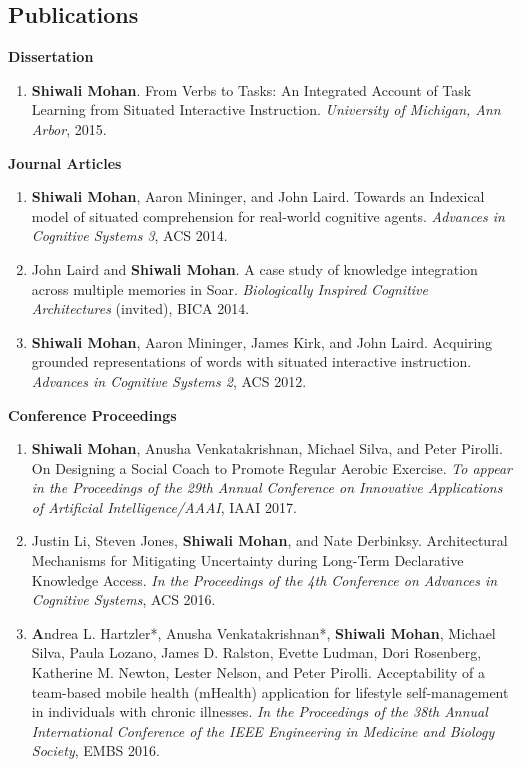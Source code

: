 \documentclass[margin,line,11pt]{res}
\begin{document}
\begin{resume}
                  \section{\sc Publications}
                  \textbf{Dissertation}
                  \begin{enumerate}[label=\lbrack D\arabic*\rbrack, leftmargin=*]
                  \item \textbf{Shiwali Mohan}.  From Verbs to Tasks: An Integrated Account of Task Learning from Situated Interactive Instruction. \emph{University of Michigan, Ann Arbor}, 2015.
                  \end{enumerate}
                  \textbf{Journal Articles}
                  \begin{enumerate}[label=\lbrack J\arabic*\rbrack, leftmargin=*]
                  \item \textbf{Shiwali Mohan}, Aaron Mininger, and John Laird. Towards an Indexical model of situated comprehension for real-world cognitive agents. \emph{Advances in Cognitive Systems 3}, ACS 2014.
                  \item John Laird and \textbf{Shiwali Mohan}. A case study of knowledge integration across multiple memories in Soar. \emph{Biologically Inspired Cognitive Architectures} (invited), BICA 2014.
                  \item \textbf{Shiwali Mohan}, Aaron Mininger, James Kirk, and John Laird. Acquiring grounded representations of words with situated interactive instruction. \emph{Advances in Cognitive Systems 2}, ACS 2012.
                  \end{enumerate}

                  \textbf{Conference Proceedings}
                  \begin{enumerate}[label=\lbrack C\arabic*\rbrack,leftmargin=*]
                    \item \textbf{Shiwali Mohan}, Anusha Venkatakrishnan, Michael Silva, and Peter Pirolli. On Designing a Social Coach to Promote Regular Aerobic Exercise. \emph{To appear in the Proceedings of the 29th Annual Conference on Innovative Applications of Artificial Intelligence/AAAI}, IAAI 2017.
                    \item Justin Li, Steven Jones, \textbf{Shiwali Mohan}, and Nate Derbinksy. Architectural Mechanisms for Mitigating Uncertainty during Long-Term Declarative Knowledge Access. \emph{In the Proceedings of the 4th Conference on Advances in Cognitive Systems}, ACS 2016.
                  \item \textbf Andrea L. Hartzler*, Anusha Venkatakrishnan*, \textbf{Shiwali Mohan}, Michael Silva, Paula Lozano, James D. Ralston, Evette Ludman, Dori Rosenberg, Katherine M. Newton, Lester Nelson, and Peter Pirolli. Acceptability of a team-based mobile health (mHealth) application for lifestyle self-management in individuals with chronic illnesses. \emph{In the Proceedings of the 38th Annual International Conference of the IEEE Engineering in Medicine and Biology Society}, EMBS 2016.
                    

\end{enumerate}
\end{resume}
\end{document}
